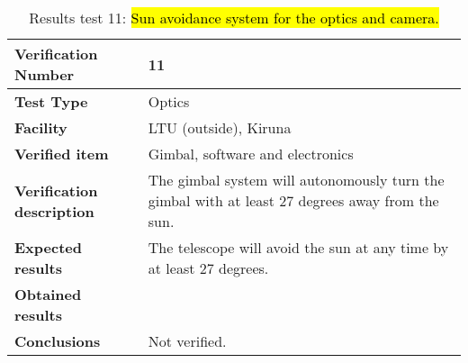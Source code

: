 \begin{table}[H]
\centering

\begin{tabular}{|m{}| m{} |}
\hline
\textbf{Verification Number} 		& 11 					\\ \hline
\textbf{Test Type} 					& Optics				\\ \hline
\textbf{Facility} 					& LTU (outside), Kiruna \\ \hline
\textbf{Verified item} 				& Gimbal, software and electronics \\ \hline

\textbf{Verification description} 	& The gimbal system will autonomously turn the gimbal with at least 27 degrees away from the sun. \\ \hline

\textbf{Expected results} 			& The telescope will avoid the sun at any time by at least 27 degrees. \\ \hline

\textbf{Obtained results} 			& \\ \hline

\textbf{Conclusions} 				& Not verified.		\\ \hline
\end{tabular}
\caption{Results test 11: \hl{Sun avoidance system for the optics and camera.}}
\label{tab:testresult11:sun}
\end{table}


\raggedbottom
